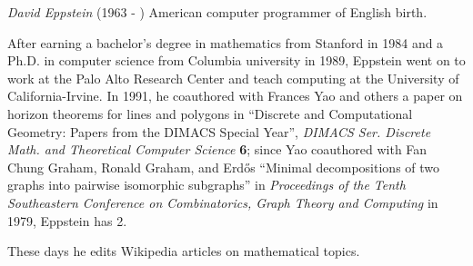 \documentclass[12pt]{article}
\begin{document}
{\em David Eppstein} (1963 - ) American computer programmer of English birth.

After earning a bachelor's degree in mathematics from Stanford in 1984 and a Ph.D. in computer science from Columbia university in 1989, Eppstein went on to work at the Palo Alto Research Center and teach computing at the University of California-Irvine. In 1991, he coauthored with Frances Yao and others a paper on horizon theorems for lines and polygons in ``Discrete and Computational Geometry: Papers from the DIMACS Special Year'', {\it DIMACS Ser. Discrete Math. and Theoretical Computer Science} {\bf 6}; since Yao coauthored with Fan Chung Graham, Ronald Graham,  and Erd\H{o}s ``Minimal decompositions of two graphs into pairwise isomorphic subgraphs'' in {\it Proceedings of the Tenth Southeastern Conference on Combinatorics, Graph Theory and Computing } in 1979, Eppstein has  2.

These days he edits Wikipedia articles on mathematical topics.
\end{document}
